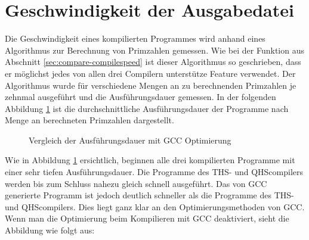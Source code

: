 \section{Geschwindigkeit der Ausgabedatei} \label{sec:execute_speed}
Die Geschwindigkeit eines kompilierten Programmes wird anhand eines Algorithmus zur Berechnung von Primzahlen gemessen. Wie bei der Funktion aus Abschnitt \ref{sec:compare-compilespeed} ist dieser Algorithmus so geschrieben,
dass er möglichst jedes von allen drei Compilern unterstütze Feature verwendet. Der Algorithmus wurde für verschiedene Mengen an zu berechnenden Primzahlen je zehnmal ausgeführt und die Ausführungsdauer gemessen.
In der folgenden Abbildung \ref{fig:executespeed_optimized} ist die durchschnittliche Ausführungsdauer der Programme nach Menge an berechneten Primzahlen dargestellt.

\begin{figure}[H]
    \centering
    \label{fig:executespeed_optimized}
    \caption{Vergleich der Ausführungsdauer mit GCC Optimierung}
\end{figure}

Wie in Abbildung \ref{fig:executespeed_optimized} ersichtlich, beginnen alle drei kompilierten Programme mit einer sehr tiefen Ausführungsdauer.
Die Programme des THS- und QHScompilers werden bis zum Schluss nahezu gleich schnell ausgeführt.
Das von GCC generierte Programm ist jedoch deutlich schneller als die Programme des THS- und QHScompilers.
Dies liegt ganz klar an den Optimierungsmethoden von GCC. Wenn man die Optimierung beim Kompilieren mit GCC deaktiviert, sieht die Abbildung wie folgt aus:

